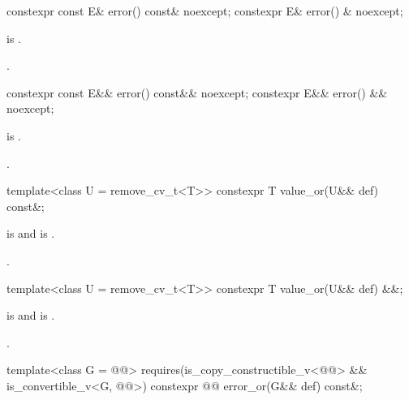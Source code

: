%
\begin{itemdecl}
constexpr const E& error() const& noexcept;
constexpr E& error() & noexcept;
\end{itemdecl}

\begin{itemdescr}
\pnum
\hardexpects
{} is .

\pnum
\returns
{}.
\end{itemdescr}

%
\begin{itemdecl}
constexpr const E&& error() const&& noexcept;
constexpr E&& error() && noexcept;
\end{itemdecl}

\begin{itemdescr}
\pnum
\hardexpects
{} is .

\pnum
\returns
{}.
\end{itemdescr}

%
\begin{itemdecl}
template<class U = remove_cv_t<T>> constexpr T value_or(U&& def) const&;
\end{itemdecl}

\begin{itemdescr}
\pnum
\mandates
{} is  and  is .

\pnum
\returns
{}.
\end{itemdescr}

%
\begin{itemdecl}
template<class U = remove_cv_t<T>> constexpr T value_or(U&& def) &&;
\end{itemdecl}

\begin{itemdescr}
\pnum
\mandates
{} is  and  is .

\pnum
\returns
{}.
\end{itemdescr}

%
\begin{itemdecl}
template<class G = @@>
  requires(is_copy_constructible_v<@@> &&
           is_convertible_v<G, @@>)
constexpr @@ error_or(G&& def) const&;
\end{itemdecl}

